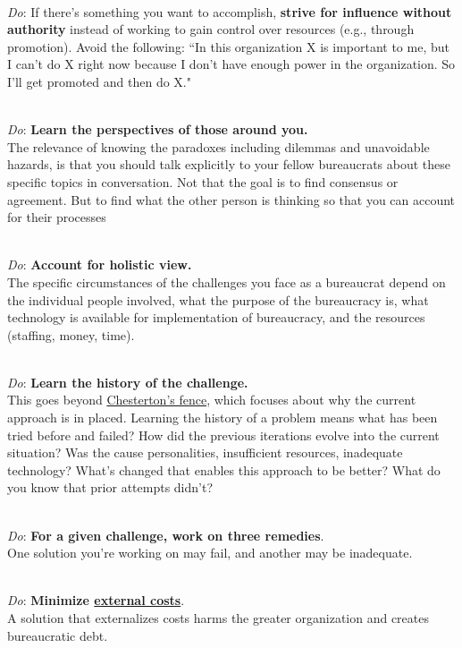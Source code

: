 \ \\
\textit{Do}: If there's something you want to accomplish, \textbf{strive for influence without authority} instead of working to gain control over resources (e.g., through promotion). Avoid the following: ``In this organization X is important to me, but I can't do X right now because I don't have enough power in the organization. So I'll get promoted and then do X."

\ \\
\textit{Do}: \textbf{Learn the perspectives of those around you.}\\
The relevance of knowing the paradoxes including dilemmas and unavoidable hazards, is that you should talk explicitly to your fellow bureaucrats about these specific topics in conversation. Not that the goal is to find consensus or agreement. But to find what the other person is thinking so that you can account for their processes

\ \\
\textit{Do}: \textbf{Account for holistic view.}\\
The specific circumstances of the challenges you face as a bureaucrat depend on the individual people involved, what the purpose of the bureaucracy is, what technology is available for implementation of bureaucracy, and the resources (staffing, money, time). 

\ \\
\textit{Do}: \textbf{Learn the history of the challenge.}\\
This goes beyond \href{https://en.wikipedia.org/wiki/G._K._Chesterton#Chesterton's_fence}{Chesterton's fence}, 
which focuses about why the current approach is in placed. Learning the history of a problem means what has been tried before and failed? How did the previous iterations evolve into the current situation? Was the cause personalities, insufficient resources, inadequate technology? What's changed that enables this approach to be better? What do you know that prior attempts didn't?

\ \\
\textit{Do}: \textbf{For a given challenge, work on three remedies}.\\
One solution you're working on may fail, and another may be inadequate. 

\ \\
\textit{Do}: \textbf{Minimize \href{https://en.wikipedia.org/wiki/Externality}{external costs}}.\\
A solution that externalizes costs harms the greater organization and creates bureaucratic debt.

